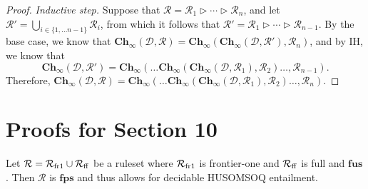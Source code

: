 \documentclass[10pt,a4paper]{amsart}
\theoremstyle{definition}
\numberwithin{equation}{section}
\providecommand{\sa}{\mathbf{Ch}_{\infty}}
\theoremstyle{plain}
\theoremstyle{definition}
\theoremstyle{myexample}
\theoremstyle{plain}
\newenvironment{customprop}[1]
  {\renewcommand\theinnercustomprop{#1}\innercustomprop}
  {\endinnercustomprop}
\theoremstyle{definition}
\newcommand{\database}{\mathcal{D}}
\newcommand{\db}{\database}
\newcommand{\cut}{\triangleright}
\newcommand{\ruleset}{\calr}
\newcommand{\fus}{\mathbf{fus}}
\newcommand{\fps}{\mathbf{fps}} %
\newcommand{\hcs}{\fps}
\newcommand{\fhcs}{\hcs}
\renewcommand{\sa}{\mathbf{Ch}_{\infty}}
\newcommand{\calr}{\mathcal{R}}
\begin{document}
\begin{proof}
\textit{Inductive step.} Suppose that $\ruleset = \ruleset_{1} \cut \cdots \cut \ruleset_{n}$, and let $\ruleset' = \bigcup_{i \in \{1, \ldots n-1\}} \ruleset_{i}$, from which it follows that $\ruleset' = \ruleset_{1} \cut \cdots \cut \ruleset_{n-1}$. By the base case, we know that $\sa(\db,\ruleset) = \sa(\sa(\db,\ruleset'),\ruleset_{n})$, and by IH, we know that $$\sa(\db,\ruleset') = \sa(\ldots\sa(\sa(\db,\ruleset_{1}),\ruleset_{2}) \ldots, \ruleset_{n-1}).$$Therefore, $\sa(\db,\ruleset) = \sa(\ldots\sa(\sa(\db,\ruleset_{1}),\ruleset_{2}) \ldots, \ruleset_{n}).$
\end{proof}

%

%




\section{Proofs for Section 10}\label{app:section-5-proofs}





\begin{customprop}{\ref{prop:frone-fusddl}}
Let $\ruleset = \ruleset_{\smash{\mathrm{fr1}}} \cup \ruleset_{\smash{\mathrm{ff}}}$ be a ruleset where $\ruleset_{\smash{\mathrm{fr1}}}$ is frontier-one and $\ruleset_{\smash{\mathrm{ff}}}$ is full and $\fus$. Then $\ruleset$ is $\fhcs$ and thus allows for decidable HUSOMSOQ entailment.  
\end{customprop}
\end{document}
